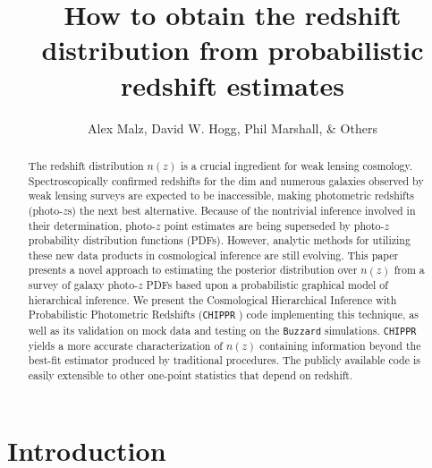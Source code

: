 \documentclass[iop]{emulateapj}
\newcommand{\chippr}{\texttt{CHIPPR} }
\begin{document}
\title{How to obtain the redshift distribution from probabilistic redshift 
estimates}

\author{Alex Malz, David W. Hogg, Phil 
Marshall, \& Others}


\begin{abstract}
The redshift distribution $n(z)$ is a crucial ingredient for weak lensing 
cosmology.  Spectroscopically confirmed redshifts for the dim and numerous 
galaxies observed by weak lensing surveys are expected to be inaccessible, 
making photometric redshifts (photo-$z$s) the next best alternative.  Because 
of the nontrivial inference involved in their determination, photo-$z$ point 
estimates are being superseded by photo-$z$ probability distribution functions 
(PDFs).  However, analytic methods for utilizing these new data products in 
cosmological inference are still evolving.  This paper presents a novel 
approach to estimating the posterior distribution over $n(z)$ from a survey of 
galaxy photo-$z$ PDFs based upon a probabilistic graphical model of 
hierarchical inference.  We present the Cosmological Hierarchical Inference 
with Probabilistic Photometric Redshifts (\chippr) code implementing this 
technique, as well as its validation on mock data and testing on the 
\texttt{Buzzard} simulations.  \chippr yields a more accurate characterization 
of $n(z)$ containing information beyond the best-fit estimator produced by 
traditional procedures.  The publicly available code is easily extensible to 
other one-point statistics that depend on redshift.

\end{abstract}


\section{Introduction}
\label{sec:introduction}
\end{document}
